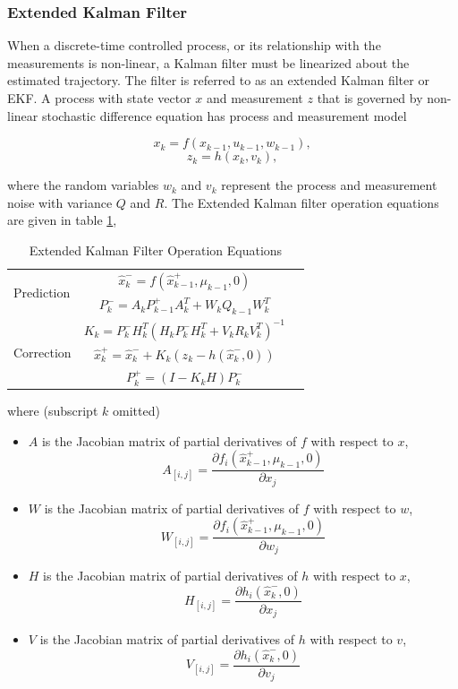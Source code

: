 \subsubsection{Extended Kalman Filter}
When a discrete-time controlled process, or its relationship with the
measurements is non-linear, a Kalman filter must be linearized about
the estimated trajectory. The filter is referred to as an extended
Kalman filter or EKF. A process with state vector $x$ and measurement
$z$ that is governed by non-linear stochastic difference equation has
process and measurement model

\begin{equation}
x_k=f(x_{k-1}, u_{k-1}, w_{k-1}),
\end{equation}
\begin{equation}
z_k=h(x_k, v_k),
\end{equation}

\noindent where the random variables $w_k$ and $v_k$ represent the
process and measurement noise with variance $Q$ and $R$. The Extended
Kalman filter operation equations are given in table \ref{tab:EKF},

\begin{table}[H]
\caption{Extended Kalman Filter Operation Equations}
\label{tab:EKF}
\centering
\begin{tabular}{|l|c r|}
\hline
\multirow{2}{*}{Prediction} 
& $\hat{x}^-_k=f(\hat{x}^+_{k-1},\mu_{k-1},0)$ & \stepcounter{equation}\thetag{\theequation}\\
& $P^-_k = A_kP^+_{k-1}A_k^T+W_kQ_{k-1}W_k^T$ & \stepcounter{equation}\thetag{\theequation}\\
\hline
\multirow{3}{*}{Correction}
& $K_k=P^-_kH_k^T(H_kP^-_kH_k^T+V_kR_kV_k^T)^{-1}$  & \stepcounter{equation}\thetag{\theequation}\\
& $\hat{x}^+_k = \hat{x}^-_k+K_k(z_k-h(\hat{x}^-_k,0))$ & \stepcounter{equation}\thetag{\theequation}\\
& $P^+_k = (I-K_kH)P^-_k$ & \stepcounter{equation}\thetag{\theequation}\\
\hline
\end{tabular}
\end{table}
\FloatBarrier

\noindent where (subscript $k$ omitted)
\begin{itemize}
  \item $A$ is the Jacobian matrix of partial derivatives of $f$ with
  respect to $x$, $$A_{[i,j]}= \frac{\partial f_i(\hat{x}_{k-1}^+,
    \mu_{k-1}, 0)}{\partial x_j}$$
  \item $W$ is the Jacobian matrix of partial derivatives of $f$ with
  respect to $w$, $$W_{[i,j]}= \frac{\partial f_i(\hat{x}_{k-1}^+,
    \mu_{k-1}, 0)}{\partial w_j}$$
  \item $H$ is the Jacobian matrix of partial derivatives of $h$ with
  respect to $x$, $$H_{[i,j]}= \frac{\partial h_i(\hat{x}_k^-,
    0)}{\partial x_j}$$
  \item $V$ is the Jacobian matrix of partial derivatives of $h$ with
  respect to $v$, $$V_{[i,j]}= \frac{\partial
    h_i(\hat{x}_k^-,0)}{\partial v_j}$$
\end{itemize}

